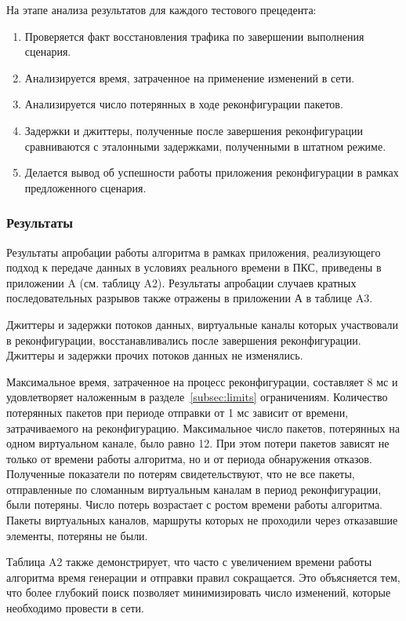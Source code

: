 \documentclass[12pt, a4paper]{article}
\begin{document}
На этапе анализа результатов для каждого тестового прецедента:
\begin{enumerate}
	\item Проверяется факт восстановления трафика по завершении выполнения сценария.
	\item Анализируется время, затраченное на применение изменений в сети.
	\item Анализируется число потерянных в ходе реконфигурации пакетов.
	\item Задержки и джиттеры, полученные после завершения реконфигурации сравниваются с эталонными задержками, полученными в штатном режиме.
	\item Делается вывод об успешности работы приложения реконфигурации в рамках предложенного сценария.
\end{enumerate}

\subsubsection{Результаты}

Результаты апробации работы алгоритма в рамках приложения, реализующего подход к передаче данных в условиях реального времени в ПКС, приведены в приложении A (см. таблицу A2). Результаты апробации случаев кратных последовательных разрывов также отражены в приложении А в таблице A3.

Джиттеры и задержки потоков данных, виртуальные каналы которых участвовали в реконфигурации, восстанавливались после завершения реконфигурации. Джиттеры и задержки прочих потоков данных не изменялись.

Максимальное время, затраченное на процесс реконфигурации, составляет 8 мс и удовлетворяет наложенным в разделе~\ref{subsec:limits} ограничениям. Количество потерянных пакетов при периоде отправки от 1 мс зависит от времени, затрачиваемого на реконфигурацию. Максимальное число пакетов, потерянных на одном виртуальном канале, было равно 12. При этом потери пакетов зависят не только от времени работы алгоритма, но и от периода обнаружения отказов. Полученные показатели по потерям свидетельствуют, что не все пакеты, отправленные по сломанным виртуальным каналам в период реконфигурации, были потеряны. Число потерь возрастает с ростом времени работы алгоритма. Пакеты виртуальных каналов, маршруты которых не проходили через отказавшие элементы, потеряны не были.

Таблица A2 также демонстрирует, что часто с увеличением времени работы алгоритма время генерации и отправки правил сокращается. Это объясняется тем, что более глубокий поиск позволяет минимизировать число изменений, которые необходимо провести в сети.
 
\end{document}
